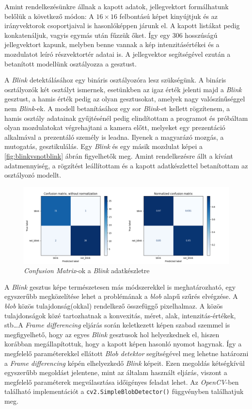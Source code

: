 Amint rendelkezésünkre állnak a kapott adatok, jellegvektort formálhatunk belőlük a következő módon: A $16\times16$ felbontású képet kinyújtjuk és az irányvektorok csoportjaival is hasonlóképpen járunk el. A kapott listákat pedig konkatenáljuk, vagyis egymás után fűzzük őket. Így egy 306 hosszúságú jellegvektort kapunk, melyben benne vannak a kép intenzitásértékei és a mozdulatot leíró részvektortér adatai is. A jellegvektor segítségével ezután a betanított modellünk osztályozza a gesztust.

A \textit{Blink} detektálásához egy bináris osztályozóra lesz szükségünk. A bináris osztályozók két osztályt ismernek, esetünkben az igaz érték jelenti majd a \textit{Blink} gesztust, a hamis érték pedig az olyan gesztusokat, amelyek nagy valószínűséggel nem \textit{Blink}-ek. A modell betanításához egy sor \textit{Blink}-et kellett rögzítenem, a hamis osztály adatainak gyűjtésénél pedig elindítottam a programot és próbáltam olyan mozdulatokat végrehajtani a kamera előtt, melyeket egy prezentáció alkalmával a prezentáló személy is leadna. Ilyenek a magyarázó mozgás, a mutogatás, gesztikulálás. Egy \textit{Blink} és egy másik mozdulat képei a \ref{fig:blinkvsnotblink} ábrán figyelhetők meg. Amint rendelkezésre állt a kívánt adatmennyiség, a rögzítést leállítottam és a kapott adatkészlettel betanítottam az osztályozó modellt.
\begin{figure}[h]
\centering
\includegraphics[width=\textwidth]{images/blink_confusion.png}
\caption{\textit{Confusion Matrix}-ok a \textit{Blink} adatkészletre}
\label{fig:blinkconfusion}
\end{figure}

A \textit{Blink} gesztus képe természetesen más módszerekkel is meghatározható, egy egyszerűbb megközelítése lehet a problémának a \textit{blob} alapű szűrés elvégzése. A \textit{blob} közös tulajdonság(okkal) rendelkező összefüggő pixelhalmaz. A közös tulajdonságok közé tartozhatnak a konvexitás, méret, alak, intenzitás-értékek, stb\ldots A \textit{Frame differencing} eljárás során keletkezett képen szabad szemmel is megfigyelhető, hogy az egyes \textit{Blink} gesztusok hol helyezkednek el, hiszen korábban megállapítottuk, hogy a kapott képen hasonló nyomot hagynak. Így a megfelelő paraméterekkel ellátott \textit{Blob detektor} segítségével meg lehetne határozni a \textit{Frame differencing} képén elhelyezkedő \textit{Blink} képeit. Ezen megoldás kétségkívül egyszerűbb megoldást jelentene, mint az általam használt eljárás, viszont a megfelelő paraméterek megválasztása időigényes feladat lehet. Az \textit{OpenCV}-ben található implementációt a \texttt{cv2.SimpleBlobDetector()} függvényben találhatjuk meg.

